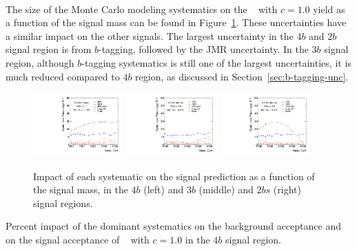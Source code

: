 \paragraph{}
The size of the Monte Carlo modeling systematics on the \Grav~ with $c=1.0$ yield as a function of the signal mass can be found in Figure~\ref{fig:signal_syst_summary}. 
These uncertainties have a similar impact on the other signals. 
The largest uncertainty in the $4b$ and $2b$ signal region is from $b$-tagging, followed by the JMR uncertainty.
In the $3b$ signal region, although $b$-tagging systematics is still one of the largest uncertainties, it is much reduced compared to $4b$ region, as discussed in Section~\ref{sec:b-tagging-unc}. 

\begin{figure}[htb!]
\begin{center}
\includegraphics[width=0.31\textwidth,angle=-90]{figures/boosted/Syst_MC/FourTag_RSG_syst.pdf}
\includegraphics[width=0.31\textwidth,angle=-90]{figures/boosted/Syst_MC/ThreeTag_RSG_syst.pdf}
\includegraphics[width=0.31\textwidth,angle=-90]{figures/boosted/Syst_MC/TwoTag_split_RSG_syst.pdf}
\caption{Impact of each systematic on the signal prediction as a function of the signal mass, in the $4b$ (left) and $3b$ (middle) and $2bs$ (right) signal regions.}
\label{fig:signal_syst_summary}
\end{center}
\end{figure}

\begin{table}[htb!]
\scriptsize
\begin{center}
\caption{Percent impact of the dominant systematics on the background acceptance
         and on the signal acceptance of \Grav~ with $c=1.0$ in the $4b$ signal region.}

\label{tab:summary-systematics-4b}
\end{center}
\end{table}

